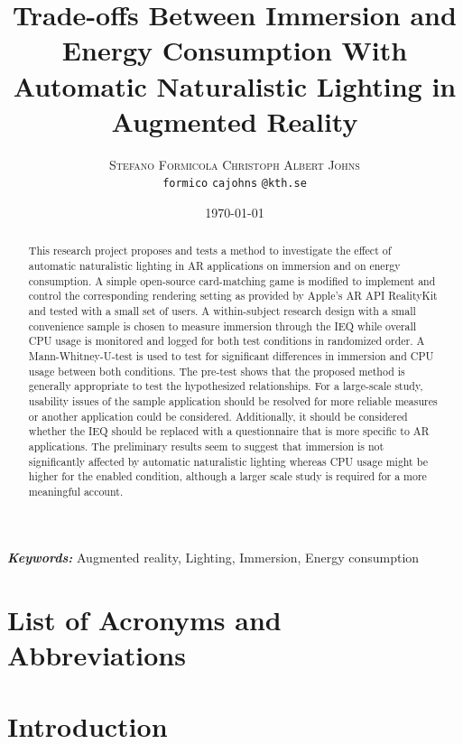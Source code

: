 \documentclass[12pt,twoside,english]{article}
\title{Trade-offs Between Immersion and Energy Consumption With Automatic Naturalistic Lighting in Augmented Reality}
\author{
        \textsc{Stefano Formicola}
            \qquad
        \textsc{Christoph Albert Johns}
        \mbox{}\\
        \normalsize
            \texttt{formico}
        \textbar{}
            \texttt{cajohns}
        \normalsize
            \texttt{@kth.se}
}
\date{\today}
\providecommand{\keywords}[1]
{
  \small	
  \textbf{\textit{Keywords:}} #1
}
\begin{document}
\maketitle


\begin{abstract}
\label{sec:abstract}

This research project proposes and tests a method to investigate the effect of automatic naturalistic lighting in \gls{AR} applications on immersion and on energy consumption.
A simple open-source card-matching game is modified to implement and control the corresponding rendering setting as provided by Apple's \gls{AR} \gls{API} RealityKit and tested with a small set of users.
A within-subject research design with a small convenience sample is chosen to measure immersion through the \gls{IEQ} while overall \gls{CPU} usage is monitored and logged for both test conditions in randomized order.
A Mann-Whitney-U-test is used to test for significant differences in immersion and \gls{CPU} usage between both conditions.
The pre-test shows that the proposed method is generally appropriate to test the hypothesized relationships.
For a large-scale study, usability issues of the sample application should be resolved for more reliable measures or another application could be considered.
Additionally, it should be considered whether the \gls{IEQ} should be replaced with a questionnaire that is more specific to \gls{AR} applications.
The preliminary results seem to suggest that immersion is not significantly affected by automatic naturalistic lighting whereas \gls{CPU} usage might be higher for the enabled condition, although a larger scale study is required for a more meaningful account.

\end{abstract}

\keywords{Augmented reality, Lighting, Immersion, Energy consumption}
\clearpage

\tableofcontents

\section*{List of Acronyms and Abbreviations}
\label{list-of-acronyms-and-abbreviations}
\renewcommand{\glossarysection}[2][]{} %
\printglossary[type=\acronymtype, nonumberlist]

\clearpage
\section{Introduction}
\label{sect:introduction}
\end{document}

